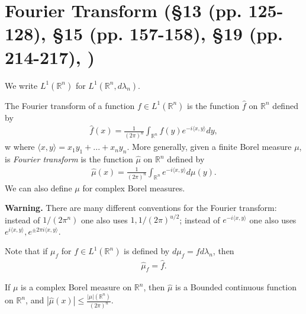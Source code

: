 \section{Fourier Transform \tiny{(§13 (pp. 125-128), §15 (pp. 157-158), §19 (pp. 214-217), \cite{schilling2017measures})}}
We write \(L^1(\mathbb{R}^n)\) for \(L^1(\mathbb{R}^n, d\lambda_n)\).

The Fourier transform of a function \(f\in L^1(\mathbb{R}^n)\) is the function \(\hat{f}\) on \(\mathbb{R}^n\) defined by
\begin{align*}
    \hat{f}(x) = \frac{1}{(2\pi)^n} \int_{\mathbb{R}^n} f(y) e^{-i\langle x,y\rangle}dy,
\end{align*}w
where \(\langle x,y\rangle = x_1y_1 + ...+x_ny_n\). More generally, given a finite Borel measure \(\mu\), is \emph{Fourier transform} is the function \(\hat{\mu}\) on \(\mathbb{R}^n\) defined by
\begin{align*}
    \hat{\mu}(x) = \frac{1}{(2\pi)^n} \int_{\mathbb{R}^n} e^{-i\langle x,y\rangle}d\mu(y).
\end{align*}
We can also define \(\mu\) for complex Borel measures. 

\textbf{Warning.} There are many different conventions for the Fourier transform: instead of \(1/(2\pi^n)\) one also uses \(1, 1/(2\pi)^{u/2}\); instead of \(e^{-i\langle x,y\rangle }\) one also uses \(e^{i\langle x,y\rangle}, e^{\pm 2\pi i\langle x,y\rangle}\). 

Note that if \(\mu_f\) for \(f\in L^1(\mathbb{R}^n)\) is defined by \(d\mu_f=fd\lambda_n\), then 
\begin{align*}
    \hat{\mu}_f = \hat{f}.
\end{align*}

\begin{lemma}
    If \(\mu\) is a complex Borel measure on \(\mathbb{R}^n\), then \(\hat{\mu}\) is a Bounded continuous function on \(\mathbb{R}^n\), and \(|\hat{\mu}(x)|\leq \frac{|\mu|(\mathbb{R}^n)}{(2\pi)^n}\). 
\end{lemma}

